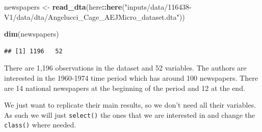 \documentclass[
]{book}
\newenvironment{Shaded}{\begin{snugshade}}{\end{snugshade}}
\newcommand{\CommentTok}[1]{\textcolor[rgb]{0.56,0.35,0.01}{\textit{#1}}}
\newcommand{\DataTypeTok}[1]{\textcolor[rgb]{0.13,0.29,0.53}{#1}}
\newcommand{\KeywordTok}[1]{\textcolor[rgb]{0.13,0.29,0.53}{\textbf{#1}}}
\newcommand{\NormalTok}[1]{#1}
\newcommand{\OperatorTok}[1]{\textcolor[rgb]{0.81,0.36,0.00}{\textbf{#1}}}
\newcommand{\StringTok}[1]{\textcolor[rgb]{0.31,0.60,0.02}{#1}}
\begin{document}
\begin{Shaded}
\begin{Highlighting}[]
\NormalTok{newspapers <-}\StringTok{ }\KeywordTok{read_dta}\NormalTok{(here}\OperatorTok{::}\KeywordTok{here}\NormalTok{(}\StringTok{"inputs/data/116438-V1/data/dta/Angelucci_Cage_AEJMicro_dataset.dta"}\NormalTok{))}

\KeywordTok{dim}\NormalTok{(newspapers)}
\end{Highlighting}
\end{Shaded}

\begin{verbatim}
## [1] 1196   52
\end{verbatim}

There are 1,196 observations in the dataset and 52 variables. The authors are interested in the 1960-1974 time period which has around 100 newspapers. There are 14 national newspapers at the beginning of the period and 12 at the end.

We just want to replicate their main results, so we don't need all their variables. As such we will just \texttt{select()} the ones that we are interested in and change the \texttt{class()} where needed.

\begin{Shaded}
\end{Shaded}
\end{document}
